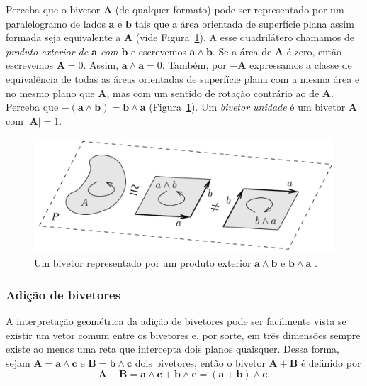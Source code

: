 \documentclass[a4paper,12pt]{report}
\theoremstyle{plain}
\theoremstyle{definition}
\newcommand{\norm}[1]{\left| #1 \right|}
\begin{document}
	Perceba que o bivetor $\mathbf A$ (de qualquer formato) pode ser representado por um paralelogramo de lados $\mathbf a$ e $\mathbf b$ tais que a área orientada de superfície plana assim formada seja equivalente a $\mathbf A$ (vide Figura~\ref{fig:2bladePlano}). A esse quadrilátero chamamos de \textit{produto exterior de $\mathbf a$ com $\mathbf b$} e escrevemos $\mathbf a \wedge \mathbf b$. Se a área de $\mathbf A$ é zero, então escrevemos $\mathbf A = 0$. Assim, $\mathbf a \wedge \mathbf a = 0$. Também, por $-\mathbf A$ expressamos a classe de equivalência de todas as áreas orientadas de superfície plana com a mesma área e no mesmo plano que $\mathbf A$, mas com um sentido de rotação contrário ao de $\mathbf A$. Perceba que $-(\mathbf a \wedge \mathbf b) = \mathbf b \wedge \mathbf a$ (Figura~\ref{fig:2bladePlano}). Um \textit{bivetor unidade} é um bivetor $\mathbf A$ com $\norm{\mathbf A} = 1$.
	
	\begin{figure}[H]
		\begin{center}
			\includegraphics[width=0.75\linewidth]{figures/2bladePlano.pdf}
		\end{center}
		\caption{Um bivetor representado por um produto exterior $\mathbf a\wedge \mathbf b$ e $\mathbf b \wedge \mathbf a$ \cite{lundholm2009clifford}.}
		\label{fig:2bladePlano}
	\end{figure}
	
	\subsubsection{Adição de bivetores}
	
	A interpretação geométrica da adição de bivetores pode ser facilmente vista se existir um vetor comum entre os bivetores e, por sorte, em três dimensões sempre existe ao menos uma reta que intercepta dois planos quaisquer. Dessa forma, sejam $\mathbf A = \mathbf a \wedge \mathbf c$ e $\mathbf B = \mathbf b \wedge \mathbf c$ dois bivetores, então o bivetor $\mathbf A + \mathbf B$ é definido por $$\mathbf A+\mathbf B = \mathbf a \wedge \mathbf c + \mathbf b \wedge \mathbf c = (\mathbf a+ \mathbf b) \wedge \mathbf c.$$ 
	
\end{document}
